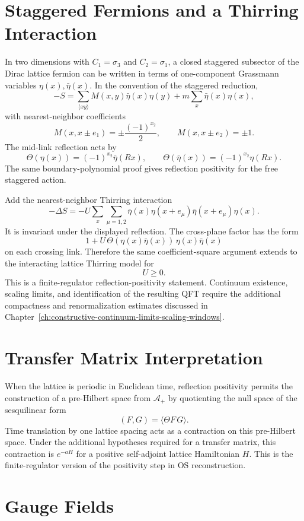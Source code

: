 \section{Staggered Fermions and a Thirring Interaction}

In two dimensions with \(C_1=\sigma_3\) and \(C_2=\sigma_1\), a closed
staggered subsector of the Dirac lattice fermion can be written in terms of
one-component Grassmann variables \(\eta(x),\bar\eta(x)\).  In the convention
of the staggered reduction,
\[
  -S
  =
  \sum_{\langle xy\rangle}M(x,y)\bar\eta(x)\eta(y)
  +m\sum_x\bar\eta(x)\eta(x),
\]
with nearest-neighbor coefficients
\[
  M(x,x\pm e_1)=\pm\frac{(-1)^{x_2}}{2},
  \qquad
  M(x,x\pm e_2)=\pm1 .
\]
The mid-link reflection acts by
\[
  \Theta(\eta(x))=(-1)^{x_2}\bar\eta(Rx),
  \qquad
  \Theta(\bar\eta(x))=(-1)^{x_2}\eta(Rx).
\]
The same boundary-polynomial proof gives reflection positivity for the free
staggered action.

Add the nearest-neighbor Thirring interaction
\[
  -\Delta S
  =
  -U\sum_{x}\sum_{\mu=1,2}
  \bar\eta(x)\eta(x+e_\mu)\bar\eta(x+e_\mu)\eta(x).
\]
It is invariant under the displayed reflection.  The cross-plane factor has
the form
\[
  1+U\,\Theta(\eta(x)\bar\eta(x))\,\eta(x)\bar\eta(x)
\]
on each crossing link.  Therefore the same coefficient-square argument
extends to the interacting lattice Thirring model for
\[
  U\geq0 .
\]
This is a finite-regulator reflection-positivity statement.  Continuum
existence, scaling limits, and identification of the resulting QFT require
the additional compactness and renormalization estimates discussed in
Chapter~\ref{ch:constructive-continuum-limits-scaling-windows}.

\section{Transfer Matrix Interpretation}

When the lattice is periodic in Euclidean time, reflection positivity permits
the construction of a pre-Hilbert space from \(\mathcal A_+\) by quotienting
the null space of the sesquilinear form
\[
  (F,G)=\langle \Theta F\,G\rangle .
\]
Time translation by one lattice spacing acts as a contraction on this
pre-Hilbert space.  Under the additional hypotheses required for a transfer
matrix, this contraction is \(e^{-aH}\) for a positive self-adjoint lattice
Hamiltonian \(H\).  This is the finite-regulator version of the positivity
step in OS reconstruction.

\section{Gauge Fields}

